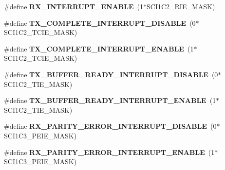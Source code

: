 \begin{DoxyCompactItemize}
\item 
\hypertarget{group__hal__hcs08_ga00ed29bebf9147d906f32ee8b026ef24}{\#define {\bfseries R\-X\-\_\-\-I\-N\-T\-E\-R\-R\-U\-P\-T\-\_\-\-E\-N\-A\-B\-L\-E}~(1$\ast$S\-C\-I1\-C2\-\_\-\-R\-I\-E\-\_\-\-M\-A\-S\-K)}\label{group__hal__hcs08_ga00ed29bebf9147d906f32ee8b026ef24}

\item 
\hypertarget{group__hal__hcs08_ga571d71662dd43839e7393fa49d15b88d}{\#define {\bfseries T\-X\-\_\-\-C\-O\-M\-P\-L\-E\-T\-E\-\_\-\-I\-N\-T\-E\-R\-R\-U\-P\-T\-\_\-\-D\-I\-S\-A\-B\-L\-E}~(0$\ast$S\-C\-I1\-C2\-\_\-\-T\-C\-I\-E\-\_\-\-M\-A\-S\-K)}\label{group__hal__hcs08_ga571d71662dd43839e7393fa49d15b88d}

\item 
\hypertarget{group__hal__hcs08_gaee61d1036e789eb51384860865302dd8}{\#define {\bfseries T\-X\-\_\-\-C\-O\-M\-P\-L\-E\-T\-E\-\_\-\-I\-N\-T\-E\-R\-R\-U\-P\-T\-\_\-\-E\-N\-A\-B\-L\-E}~(1$\ast$S\-C\-I1\-C2\-\_\-\-T\-C\-I\-E\-\_\-\-M\-A\-S\-K)}\label{group__hal__hcs08_gaee61d1036e789eb51384860865302dd8}

\item 
\hypertarget{group__hal__hcs08_ga3168abbaed1501827b501cde77617636}{\#define {\bfseries T\-X\-\_\-\-B\-U\-F\-F\-E\-R\-\_\-\-R\-E\-A\-D\-Y\-\_\-\-I\-N\-T\-E\-R\-R\-U\-P\-T\-\_\-\-D\-I\-S\-A\-B\-L\-E}~(0$\ast$S\-C\-I1\-C2\-\_\-\-T\-I\-E\-\_\-\-M\-A\-S\-K)}\label{group__hal__hcs08_ga3168abbaed1501827b501cde77617636}

\item 
\hypertarget{group__hal__hcs08_ga35bcc3d9078a9d99a8760e2c2e3953db}{\#define {\bfseries T\-X\-\_\-\-B\-U\-F\-F\-E\-R\-\_\-\-R\-E\-A\-D\-Y\-\_\-\-I\-N\-T\-E\-R\-R\-U\-P\-T\-\_\-\-E\-N\-A\-B\-L\-E}~(1$\ast$S\-C\-I1\-C2\-\_\-\-T\-I\-E\-\_\-\-M\-A\-S\-K)}\label{group__hal__hcs08_ga35bcc3d9078a9d99a8760e2c2e3953db}

\item 
\hypertarget{group__hal__hcs08_ga5442523637fd7e9c39aaa1c30b5ac306}{\#define {\bfseries R\-X\-\_\-\-P\-A\-R\-I\-T\-Y\-\_\-\-E\-R\-R\-O\-R\-\_\-\-I\-N\-T\-E\-R\-R\-U\-P\-T\-\_\-\-D\-I\-S\-A\-B\-L\-E}~(0$\ast$S\-C\-I1\-C3\-\_\-\-P\-E\-I\-E\-\_\-\-M\-A\-S\-K)}\label{group__hal__hcs08_ga5442523637fd7e9c39aaa1c30b5ac306}

\item 
\hypertarget{group__hal__hcs08_gad0bec7d431949da04eb4c6bb58a18e5a}{\#define {\bfseries R\-X\-\_\-\-P\-A\-R\-I\-T\-Y\-\_\-\-E\-R\-R\-O\-R\-\_\-\-I\-N\-T\-E\-R\-R\-U\-P\-T\-\_\-\-E\-N\-A\-B\-L\-E}~(1$\ast$S\-C\-I1\-C3\-\_\-\-P\-E\-I\-E\-\_\-\-M\-A\-S\-K)}\label{group__hal__hcs08_gad0bec7d431949da04eb4c6bb58a18e5a}


\end{DoxyCompactItemize}

